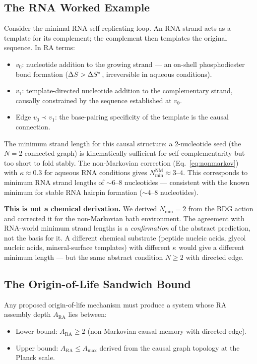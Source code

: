 \documentclass[12pt,a4paper]{article}
\begin{document}
\subsection{The RNA Worked Example}

Consider the minimal RNA self-replicating loop.  An RNA strand acts as a template for its complement; the complement then templates the original sequence.  In RA terms:
\begin{itemize}
  \item $v_0$: nucleotide addition to the growing strand — an on-shell phosphodiester bond formation ($\Delta S > \Delta S^*$, irreversible in aqueous conditions).
  \item $v_1$: template-directed nucleotide addition to the complementary strand, causally constrained by the sequence established at $v_0$.
  \item Edge $v_0 \prec v_1$: the base-pairing specificity of the template is the causal connection.
\end{itemize}

The minimum strand length for this causal structure: a 2-nucleotide seed (the $N=2$ connected graph) is kinematically sufficient for self-complementarity but too short to fold stably.  The non-Markovian correction (Eq.~\ref{eq:nonmarkov}) with $\kappa \approx 0.3$ for aqueous RNA conditions gives $N_{\min}^{\mathrm{NM}} \approx 3$--$4$.  This corresponds to minimum RNA strand lengths of $\sim 6$--$8$ nucleotides — consistent with the known minimum for stable RNA hairpin formation ($\sim 4$--$8$ nucleotides).

\textbf{This is not a chemical derivation.}  We derived $N_{\min} = 2$ from the BDG action and corrected it for the non-Markovian bath environment.  The agreement with RNA-world minimum strand lengths is a \emph{confirmation} of the abstract prediction, not the basis for it.  A different chemical substrate (peptide nucleic acids, glycol nucleic acids, mineral-surface templates) with different $\kappa$ would give a different minimum length — but the same abstract condition $N\geq 2$ with directed edge.

\subsection{The Origin-of-Life Sandwich Bound}

Any proposed origin-of-life mechanism must produce a system whose RA assembly depth $A_{\mathrm{RA}}$ lies between:
\begin{itemize}
  \item Lower bound: $A_{\mathrm{RA}} \geq 2$ (non-Markovian causal memory with directed edge).
  \item Upper bound: $A_{\mathrm{RA}} \leq A_{\mathrm{max}}$ derived from the causal graph topology at the Planck scale.
\end{itemize}
\end{document}
